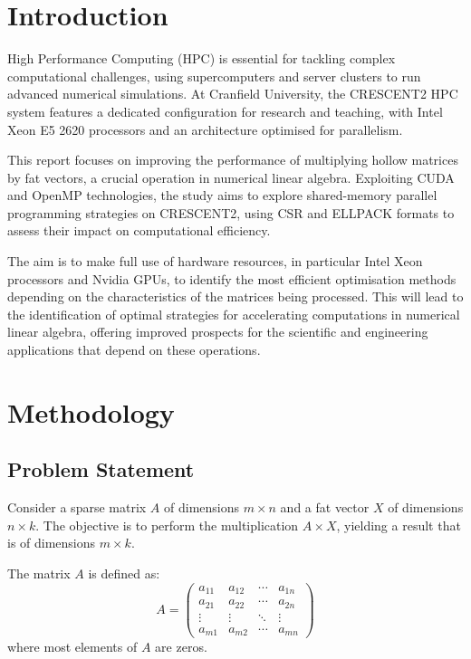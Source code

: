 \documentclass[12pt,oneside]{book} %
\begin{document}
\chapter{Introduction}
High Performance Computing (HPC) is essential for tackling complex
computational challenges, using supercomputers and server clusters to run
advanced numerical simulations. At Cranfield University, the CRESCENT2 HPC
system features a dedicated configuration for research and teaching, with Intel
Xeon E5 2620 processors and an architecture optimised for parallelism.

This report focuses on improving the performance of multiplying hollow matrices
by fat vectors, a crucial operation in numerical linear algebra. Exploiting
CUDA and OpenMP technologies, the study aims to explore shared-memory parallel
programming strategies on CRESCENT2, using CSR and ELLPACK formats to assess
their impact on computational efficiency.

The aim is to make full use of hardware resources, in particular Intel Xeon
processors and Nvidia GPUs, to identify the most efficient optimisation methods
depending on the characteristics of the matrices being processed. This will
lead to the identification of optimal strategies for accelerating computations
in numerical linear algebra, offering improved prospects for the scientific and
engineering applications that depend on these operations.

\chapter{Methodology}

\section{Problem Statement}
Consider a sparse matrix $A$ of dimensions $m \times n$ and a fat vector $X$ of
dimensions $n \times k$. The objective is to perform the multiplication $A
    \times X$, yielding a result that is of dimensions $m \times k$.

The matrix $A$ is defined as:
\begin{equation}
    A = \begin{pmatrix}
        a_{11} & a_{12} & \cdots & a_{1n} \\
        a_{21} & a_{22} & \cdots & a_{2n} \\
        \vdots & \vdots & \ddots & \vdots \\
        a_{m1} & a_{m2} & \cdots & a_{mn}
    \end{pmatrix}
\end{equation}\label{eq:sparse-matrix}
where most elements of $A$ are zeros.
\end{document}
